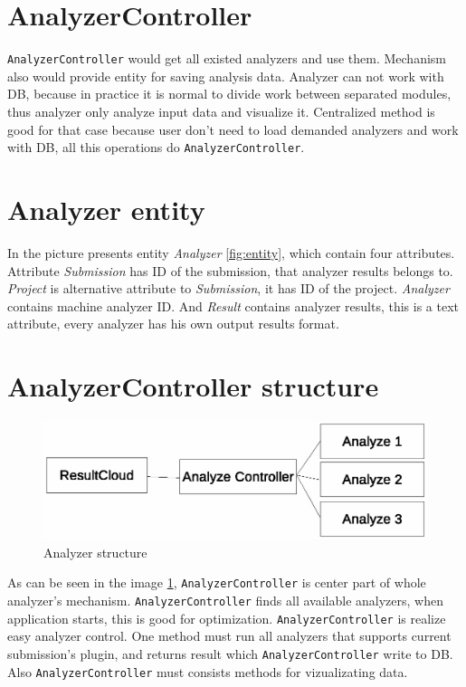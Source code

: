 \section{AnalyzerController}

\texttt{AnalyzerController} would get all existed analyzers and use them. Mechanism also would provide entity for saving analysis data. Analyzer can not work with DB, because in practice it is normal to divide work between separated modules, thus analyzer only analyze input data and visualize it. Centralized method is good for that case because user don't need to load demanded analyzers and work with DB, all this operations do \texttt{AnalyzerController}.

\section{Analyzer entity}

In the picture presents entity \emph{Analyzer} \ref{fig:entity}, which contain four attributes. Attribute \emph{Submission} has ID of the submission, that analyzer results belongs to. \emph{Project} is alternative attribute to \emph{Submission}, it has ID of the project. \emph{Analyzer} contains machine analyzer ID. And \emph{Result} contains analyzer results, this is a text attribute, every analyzer has his own output results format.

\section{AnalyzerController structure}

\begin{figure}
  \centering
    \includegraphics[trim=0 22cm 0 0,scale=0.8]{fig/analyzer-struct.eps}
  \caption{Analyzer structure}
  \label{fig:an_struct}
\end{figure}

As can be seen in the image \ref{fig:an_struct}, \texttt{AnalyzerController} is center part of whole analyzer's mechanism. \texttt{AnalyzerController} finds all available analyzers, when application starts, this is good for optimization. \texttt{AnalyzerController} is realize easy analyzer control. One method must run all analyzers that supports current submission's plugin, and returns result which \texttt{AnalyzerController} write to DB. Also \texttt{AnalyzerController} must consists methods for vizualizating data.

